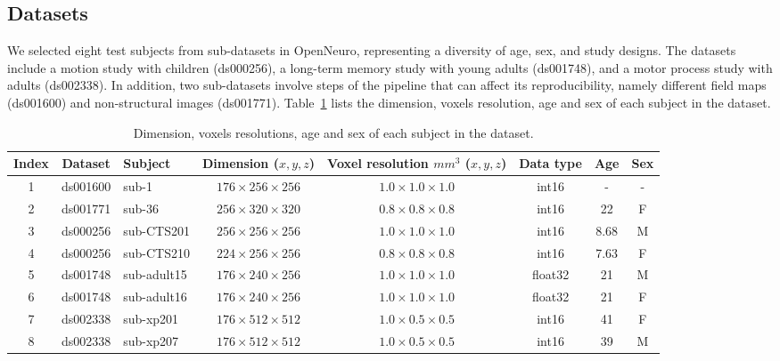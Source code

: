 \documentclass{article}
\begin{document}
\subsection{Datasets}

We selected eight test subjects from sub-datasets in OpenNeuro, representing a
diversity of age, sex, and study designs. The datasets include a motion study
with children (ds000256), a long-term memory study with young adults (ds001748),
and a motor process study with adults (ds002338). In addition, two sub-datasets
involve steps of the pipeline that can affect its reproducibility, namely
different field maps (ds001600) and non-structural images (ds001771).
Table~\ref{table:dataset_info} lists the dimension, voxels resolution, age and sex of each
subject in the dataset.

\begin{table}
    \begin{center}
        \begin{tabular}{ c|c|l|c|c|c|c|c}
            Index & Dataset  & Subject     & Dimension ($x,y,z$)         & Voxel resolution $mm^3$ ($x,y,z$) & Data type & Age  & Sex \\
            \hline
            1     & ds001600 & sub-1       & $176 \times 256 \times 256$ & $1.0 \times 1.0 \times 1.0$       & int16     & -    & -   \\
            2     & ds001771 & sub-36      & $256 \times 320 \times 320$ & $0.8 \times 0.8 \times 0.8$       & int16     & 22   & F   \\
            3     & ds000256 & sub-CTS201  & $256 \times 256 \times 256$ & $1.0 \times 1.0 \times 1.0$       & int16     & 8.68 & M   \\
            4     & ds000256 & sub-CTS210  & $224 \times 256 \times 256$ & $0.8 \times 0.8 \times 0.8$       & int16     & 7.63 & F   \\
            5     & ds001748 & sub-adult15 & $176 \times 240 \times 256$ & $1.0 \times 1.0 \times 1.0$       & float32   & 21   & M   \\
            6     & ds001748 & sub-adult16 & $176 \times 240 \times 256$ & $1.0 \times 1.0 \times 1.0$       & float32   & 21   & F   \\
            7     & ds002338 & sub-xp201   & $176 \times 512 \times 512$ & $1.0 \times 0.5 \times 0.5$       & int16     & 41   & F   \\
            8     & ds002338 & sub-xp207   & $176 \times 512 \times 512$ & $1.0 \times 0.5 \times 0.5$       & int16     & 39   & M   \\
        \end{tabular}
    \end{center}
    \caption{Dimension, voxels resolutions, age and sex of each subject in the dataset.}
    \label{table:dataset_info}
\end{table}
\end{document}
